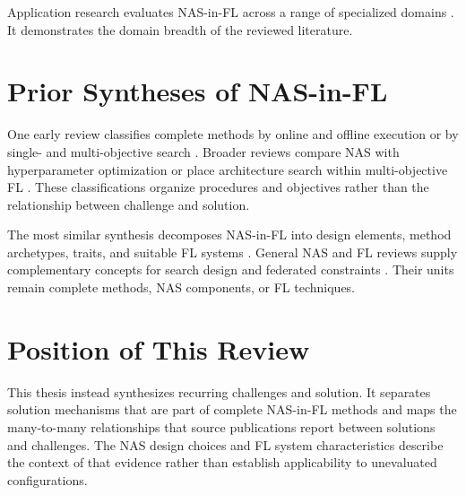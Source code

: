 Application research evaluates NAS-in-FL across a range of specialized domains \cite{breastcancer_fednas_2024,cit2fr-fl-nas_2022,electricity_load_forecasting_fl_darts_2023,energy_fednas_2025,epistatis_detection_fuzzy_fednas_2025,fed_auto_mri_2023,fedregnas_2025,intrusion_detection_fednas_2024,load_monitoring_fednas_2025,medical_image_segmentation_fednas_2024,mri_generalizable_reconstruction_fednas_2025,prostate_mri_fednas_2021,remote_sensing_fednas_2025,sfnas-ddpg_2024,supervised_fednas_2023,wind_power_prediction_fednas_2024}. It demonstrates the domain breadth of the reviewed literature.

\section{Prior Syntheses of NAS-in-FL}

One early review classifies complete methods by online and offline execution or by single- and multi-objective search \cite{fl_to_nas_survey_2021}. Broader reviews compare NAS with hyperparameter optimization or place architecture search within multi-objective FL \cite{nas_hpo_fl_survey_2023,multi-objective_methods_in_fl_2025}. These classifications organize procedures and objectives rather than the relationship between challenge and solution.

The most similar synthesis decomposes NAS-in-FL into design elements, method archetypes, traits, and suitable FL systems \cite{nas_in_fl_2026}. General NAS and FL reviews supply complementary concepts for search design and federated constraints \cite{nas_survey_2019,fl_taxonomy_2024}. Their units remain complete methods, NAS components, or FL techniques.

\section{Position of This Review}

This thesis instead synthesizes recurring challenges and solution. It separates solution mechanisms that are part of complete NAS-in-FL methods and maps the many-to-many relationships that source publications report between solutions and challenges. The NAS design choices and FL system characteristics describe the context of that evidence rather than establish applicability to unevaluated configurations.
